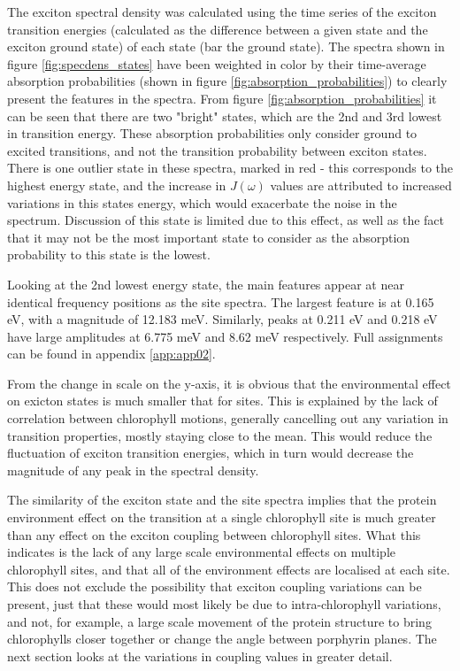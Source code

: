 The exciton spectral density was calculated using the time series of the exciton
transition energies (calculated as the difference between a given state and the
exciton ground state) of each state (bar the ground state). The spectra shown in 
figure \ref{fig:specdens_states} have been weighted in color by their time-average
absorption probabilities (shown in figure \ref{fig:absorption_probabilities}) to
clearly present the features in the spectra. From figure \ref{fig:absorption_probabilities}
it can be seen that there are two "bright" states, which are the 2nd and 3rd lowest
in transition energy. These absorption probabilities only consider ground to excited 
transitions, and not the transition probability between exciton states. There is
one outlier state in these spectra, marked in red - this corresponds to the highest
energy state, and the increase in $J\left(\omega\right)$ values are attributed to 
increased variations in this states energy, which would exacerbate the noise in 
the spectrum. Discussion of this state is limited due to this effect, as well as 
the fact that it may not be the most important state to consider as the absorption
probability to this state is the lowest.

Looking at the 2nd lowest energy state, the main features appear at near identical
frequency positions as the site spectra. The largest feature is at 0.165 eV, with
a magnitude of 12.183 meV. Similarly, peaks at 0.211 eV and 0.218 eV have large
amplitudes at 6.775 meV and 8.62 meV respectively. Full assignments can be found
in appendix \ref{app:app02}.

From the change in scale on the y-axis, it is obvious that the environmental effect
on exicton states is much smaller that for sites. This is explained by the lack
of correlation between chlorophyll motions, generally cancelling out any variation
in \Qy transition properties, mostly staying close to the mean. This would reduce
the fluctuation of exciton transition energies, which in turn would decrease the
magnitude of any peak in the spectral density.

The similarity of the exciton state and the site spectra implies that the protein
environment effect on the transition at a single chlorophyll site is much greater 
than any effect on the exciton coupling between chlorophyll sites. What this indicates
is the lack of any large scale environmental effects on multiple chlorophyll sites,
and that all of the environment effects are localised at each site. This does not 
exclude the possibility that exciton coupling variations can be present, just that
these would most likely be due to intra-chlorophyll variations, and not, for example,
a large scale movement of the protein structure to bring chlorophylls closer together
or change the angle between porphyrin planes. The next section looks at the variations
in coupling values in greater detail.

